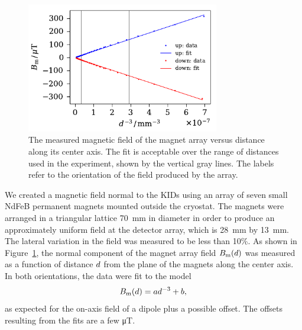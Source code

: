\begin{figure}[htb]
\centering
\includegraphics[width=0.75\textwidth]{loss/magnet_array_field_vs_distance.pdf}
\caption[The measured magnetic field of the magnet array versus distance along its center axis.]
{The measured magnetic field of the magnet array versus distance along its center axis.
The fit is acceptable over the range of distances used in the experiment, shown by the vertical gray lines.
The labels refer to the orientation of the field produced by the array.}
\label{fig:magnet_array_field_vs_distance}
\end{figure}

We created a magnetic field normal to the KIDs using an array of seven small NdFeB permanent magnets mounted outside the cryostat.
The magnets were arranged in a triangular lattice \SI{70}{mm} in diameter in order to produce an approximately uniform field at the detector array, which is \SI{28}{mm} by \SI{13}{mm}.
The lateral variation in the field was measured to be less than 10\%. 
As shown in Figure~\ref{fig:magnet_array_field_vs_distance}, the normal component of the magnet array field $B_{\mathrm{m}}(d)$ was measured as a function of distance $d$ from the plane of the magnets along the center axis.
In both orientations, the data were fit to the model
\begin{equation}
B_{\mathrm{m}}(d)
  =
  a d^{-3} + b,
\label{eqn:magnet_array_field_vs_distance}
\end{equation}
as expected for the on-axis field of a dipole plus a possible offset.
The offsets resulting from the fits are a few \si{\micro T}.

